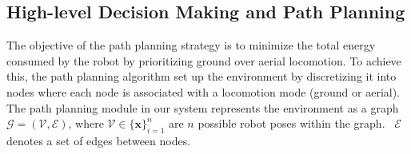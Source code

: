 \documentclass[letterpaper, 10 pt, conference]{ieeeconf}  %
\newcommand{\eg}{\emph{e.g.},}
\newcommand{\filip}[1]{{\color{green}#1}}
\begin{document}
{
\subsection{High-level Decision Making and Path Planning}

The objective of the path planning strategy is to minimize the total energy consumed by the robot by prioritizing ground over aerial locomotion. To achieve this, the path planning algorithm set up the environment by discretizing it into nodes where each node is associated with a locomotion mode (ground or aerial). The path planning module in our system represents the environment as a graph $\mathcal{G}=(\mathcal{V}, \mathcal{E})$, where $\mathcal{V}\in\{\mathbf{x}\}^n_{i=1}$ are $n$ possible robot poses within the graph. 
~$\mathcal{E}$ denotes a set of edges between nodes. 




}
\end{document}
